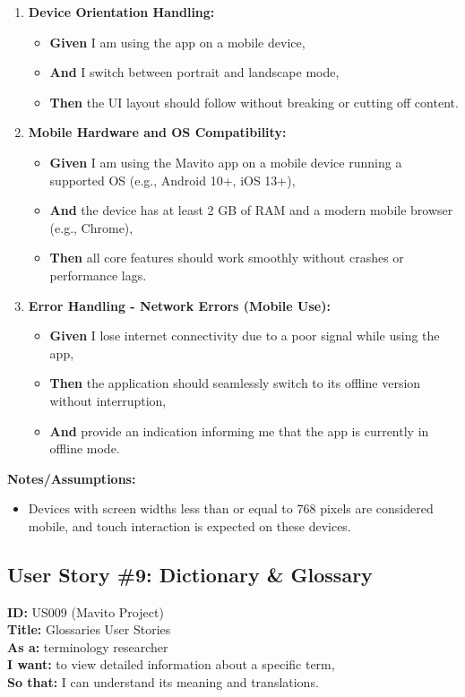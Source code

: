 \documentclass[12pt]{article}
\begin{document}
\begin{enumerate}
    \item \textbf{Device Orientation Handling:}
    \begin{itemize}
        \item \textbf{Given} I am using the app on a mobile device,
        \item \textbf{And} I switch between portrait and landscape mode,
        \item \textbf{Then} the UI layout should follow without breaking or cutting off content.
    \end{itemize}

    \item \textbf{Mobile Hardware and OS Compatibility:}
    \begin{itemize}
        \item \textbf{Given} I am using the Mavito app on a mobile device running a supported OS (e.g., Android 10+, iOS 13+),
        \item \textbf{And} the device has at least 2 GB of RAM and a modern mobile browser (e.g., Chrome),
        \item \textbf{Then} all core features should work smoothly without crashes or performance lags.
    \end{itemize}

    \item \textbf{Error Handling - Network Errors (Mobile Use):}
    \begin{itemize}
        \item \textbf{Given} I lose internet connectivity due to a poor signal while using the app,
        \item \textbf{Then} the application should seamlessly switch to its offline version without interruption,
        \item \textbf{And} provide an indication informing me that the app is currently in offline mode.
    \end{itemize}
\end{enumerate}

\vspace{1em}
\textbf{Notes/Assumptions:}
\begin{itemize}
    \item Devices with screen widths less than or equal to 768 pixels are considered mobile, and touch interaction is expected on these devices.
\end{itemize}



\subsection{User Story \#9: Dictionary & Glossary}
\textbf{ID:} US009 (Mavito Project) \\
\textbf{Title:} Glossaries User Stories \\
\textbf{As a:}  terminology researcher \\
\textbf{I want:}  to view detailed information about a specific term, \\
\textbf{So that:} I can understand its meaning and translations.
\end{document}
